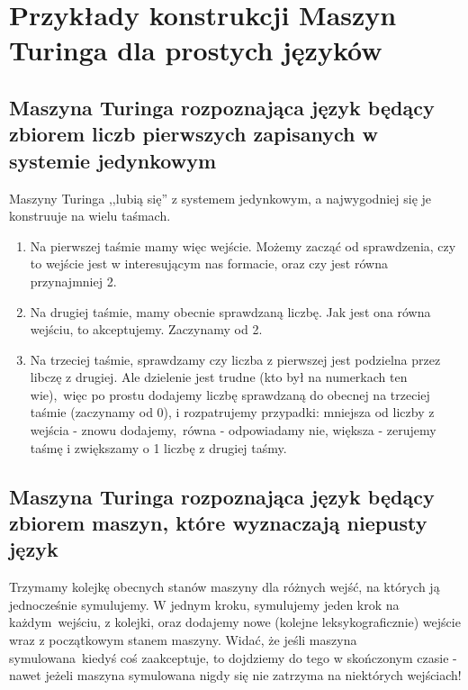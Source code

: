 \section{Przykłady konstrukcji Maszyn Turinga dla prostych języków}

\subsection{Maszyna Turinga rozpoznająca język będący zbiorem liczb pierwszych zapisanych w systemie jedynkowym}

Maszyny Turinga ,,lubią się'' z systemem jedynkowym, a najwygodniej się je konstruuje na wielu taśmach.

\begin{enumerate}
    \item Na pierwszej taśmie mamy więc wejście. Możemy zacząć od sprawdzenia, czy to wejście jest w interesującym nas formacie, oraz czy jest równa przynajmniej 2.
    \item Na drugiej taśmie, mamy obecnie sprawdzaną liczbę. Jak jest ona równa wejściu, to akceptujemy. Zaczynamy od 2.
    \item Na trzeciej taśmie, sprawdzamy czy liczba z pierwszej jest podzielna przez libczę z drugiej. Ale dzielenie jest trudne (kto był na numerkach ten wie),\
    więc po prostu dodajemy liczbę sprawdzaną do obecnej na trzeciej taśmie (zaczynamy od 0), i rozpatrujemy przypadki: mniejsza od liczby z wejścia - znowu dodajemy,\
    równa - odpowiadamy nie, większa - zerujemy taśmę i zwiększamy o 1 liczbę z drugiej taśmy.
\end{enumerate}

\subsection{Maszyna Turinga rozpoznająca język będący zbiorem maszyn, które wyznaczają niepusty język}

Trzymamy kolejkę obecnych stanów maszyny dla różnych wejść, na których ją jednocześnie symulujemy. W jednym kroku, symulujemy jeden krok na każdym\
wejściu, z kolejki, oraz dodajemy nowe (kolejne leksykograficznie) wejście wraz z początkowym stanem maszyny. Widać, że jeśli maszyna symulowana\
kiedyś coś zaakceptuje, to dojdziemy do tego w skończonym czasie - nawet jeżeli maszyna symulowana nigdy się nie zatrzyma na niektórych wejściach!